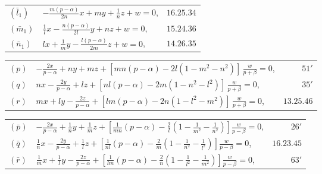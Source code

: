 \documentclass[12pt,a4paper]{article}
\begin{document}
\begin{center}
\begin{tabular}{@{}l@{\qquad}l@{\qquad}r@{}}
$(\bar{l}_1)$ & $\displaystyle -\frac{m(p - \alpha)}{2n}x + my + \frac{1}{n}z + w = 0$, & $16.25.34$ \\[4pt]
$(\bar{m}_1)$ & $\displaystyle \frac{1}{l}x - \frac{n(p - \alpha)}{2l}y + nz + w = 0$, & $15.24.36$ \\[4pt]
$(\bar{n}_1)$ & $\displaystyle lx + \frac{1}{m}y - \frac{l(p - \alpha)}{2m}z + w = 0$, & $14.26.35$
\end{tabular}
\end{center}

\begin{center}
\begin{tabular}{@{}l@{\qquad}l@{\qquad}r@{}}
$(p)$ & $\displaystyle -\frac{2x}{p - \alpha} + ny + mz + [mn(p - \alpha) - 2l(1 - m^2 - n^2)]\,\frac{w}{p + \beta} = 0$, & $51'$ \\[4pt]
$(q)$ & $\displaystyle nx - \frac{2y}{p - \alpha} + lz + [nl(p - \alpha) - 2m(1 - n^2 - l^2)]\,\frac{w}{p + \beta} = 0$, & $35'$ \\[4pt]
$(r)$ & $\displaystyle mx + ly - \frac{2z}{p - \alpha} + [lm(p - \alpha) - 2n(1 - l^2 - m^2)]\,\frac{w}{p + \beta} = 0$, & $13.25.46$
\end{tabular}
\end{center}

\begin{center}
\begin{tabular}{@{}l@{\qquad}l@{\qquad}r@{}}
$(\bar{p})$ & $\displaystyle -\frac{2x}{p - \alpha} + \frac{1}{n}y + \frac{1}{m}z + \left[\frac{1}{mn}(p - \alpha) - \frac{2}{l}\left(1 - \frac{1}{m^2} - \frac{1}{n^2}\right)\right]\frac{w}{p - \beta} = 0$, & $26'$ \\[4pt]
$(\bar{q})$ & $\displaystyle \frac{1}{n}x - \frac{2y}{p - \alpha} + \frac{1}{l}z + \left[\frac{1}{nl}(p - \alpha) - \frac{2}{m}\left(1 - \frac{1}{n^2} - \frac{1}{l^2}\right)\right]\frac{w}{p - \beta} = 0$, & $16.23.45$ \\[4pt]
$(\bar{r})$ & $\displaystyle \frac{1}{m}x + \frac{1}{l}y - \frac{2z}{p - \alpha} + \left[\frac{1}{lm}(p - \alpha) - \frac{2}{n}\left(1 - \frac{1}{l^2} - \frac{1}{m^2}\right)\right]\frac{w}{p - \beta} = 0$, & $63'$
\end{tabular}
\end{center}
\end{document}
